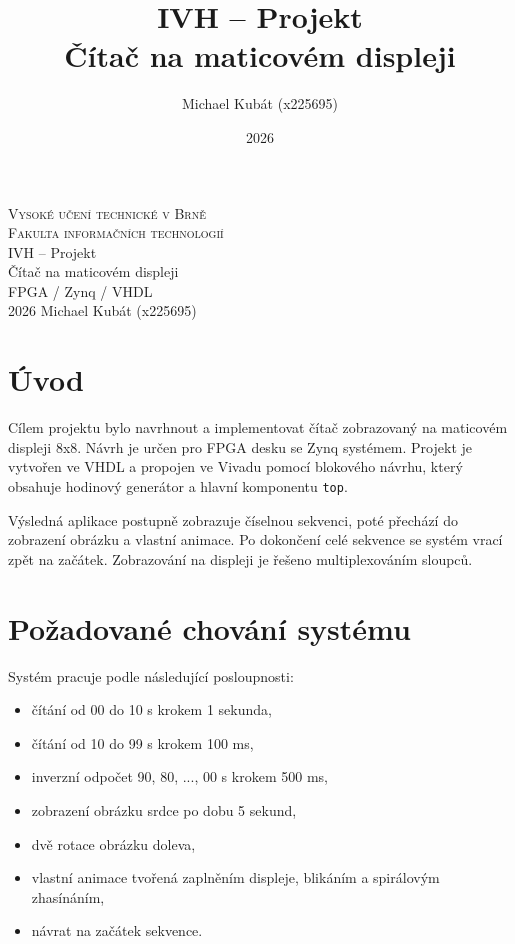 \documentclass[11pt,a4paper]{article}
\title{IVH -- Projekt \\ Čítač na maticovém displeji}
\author{Michael Kubát (x225695)}
\date{2026}
\begin{document}
\begin{titlepage}
    \centering
    {\Huge \textsc{Vysoké učení technické v Brně}} \\
    \vspace{0.5em}
    {\huge \textsc{Fakulta informačních technologií}} \\
    {\huge IVH -- Projekt} \\
    \vspace{0.8em}
    {\Huge Čítač na maticovém displeji} \\
    \vspace{1.5em}
    {\Large FPGA / Zynq / VHDL} \\
    {\Large 2026 \hfill Michael Kubát (x225695)}
\end{titlepage}

\tableofcontents
\newpage

\section{Úvod}

Cílem projektu bylo navrhnout a implementovat čítač zobrazovaný na maticovém displeji 8x8. Návrh je určen pro FPGA desku se Zynq systémem. Projekt je vytvořen ve VHDL a propojen ve Vivadu pomocí blokového návrhu, který obsahuje hodinový generátor a hlavní komponentu \texttt{top}.

Výsledná aplikace postupně zobrazuje číselnou sekvenci, poté přechází do zobrazení obrázku a vlastní animace. Po dokončení celé sekvence se systém vrací zpět na začátek. Zobrazování na displeji je řešeno multiplexováním sloupců.

\section{Požadované chování systému}

Systém pracuje podle následující posloupnosti:

\begin{itemize}
    \item čítání od 00 do 10 s krokem 1 sekunda,
    \item čítání od 10 do 99 s krokem 100 ms,
    \item inverzní odpočet 90, 80, ..., 00 s krokem 500 ms,
    \item zobrazení obrázku srdce po dobu 5 sekund,
    \item dvě rotace obrázku doleva,
    \item vlastní animace tvořená zaplněním displeje, blikáním a spirálovým zhasínáním,
    \item návrat na začátek sekvence.
\end{itemize}
\end{document}
